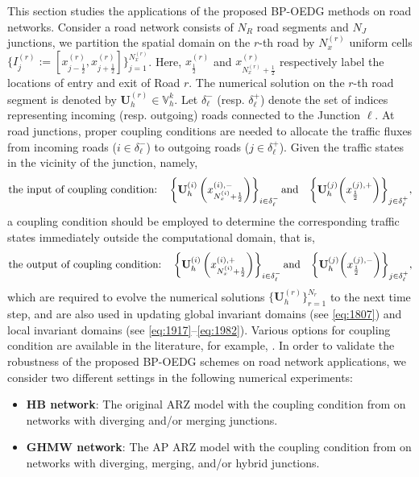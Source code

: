 \documentclass[times,final]{elsarticle}
\numberwithin{equation}{section}
\theoremstyle{definition}
\theoremstyle{remark}
\newcommand{\BU}{\mathbf{U}}
\begin{document}
This section studies the applications of the proposed BP-OEDG methods on road networks. 
Consider a road network consists of $N_R$ road segments and $N_J$ junctions, we partition the spatial domain on the $r$-th road by $N_x^{(r)}$ uniform cells $\big\{I_j^{(r)} := [x^{(r)}_{j - \frac{1}{2}}, x^{(r)}_{j + \frac{1}{2}}] \big \}_{j = 1}^{N_x^{(r)}}$. 
Here, $x^{(r)}_\frac12$ and $x^{(r)}_{N_x^{(r)}+\frac12}$ respectively label the locations of entry and exit of Road $r$.
The numerical solution on the $r$-th road segment is denoted by $\BU^{(r)}_h \in \mathbb{V}^k_h$. Let $\delta_{\ell}^-$ (resp. $\delta_{\ell}^+$) denote the set of indices representing incoming (resp. outgoing) roads connected to the Junction $\ell$. 
At road junctions, proper coupling conditions are needed to allocate the traffic fluxes from incoming roads ($i \in \delta^-_\ell$) to outgoing roads ($j \in \delta^+_\ell$).
Given the traffic states in the vicinity of the junction, namely,
\[
\textrm{the input of coupling condition:}
\quad
\left \{ \BU^{(i)}_h \left(x_{N_x^{(i)} + \frac{1}{2}}^{(i), -} \right) \right \}_{i \in \delta_\ell^-} {\rm and} \quad
\bigg\{ \BU^{(j)}_h \bigg(x_{\frac{1}{2}}^{(j), +} \bigg) \bigg\}_{j \in \delta_\ell^+},
\]
a coupling condition should be employed to determine the corresponding traffic states immediately outside the computational domain, that is,
\[
\textrm{the output of coupling condition:}
\quad
\left \{ \BU^{(i)}_h \left(x_{N_x^{(i)} + \frac{1}{2}}^{(i), +} \right) \right \}_{i \in \delta_\ell^-} {\rm and} \quad
\bigg\{ \BU^{(j)}_h \bigg(x_{\frac{1}{2}}^{(j), -} \bigg) \bigg\}_{j \in \delta_\ell^+},
\]
which are required to evolve the numerical solutions $\{\BU^{(r)}_h\}_{r=1}^{N_r}$ to the next time step, and are also used in updating global invariant domains (see \eqref{eq:1807}) and local invariant domains (see \eqref{eq:1917}--\eqref{eq:1982}). Various options for coupling condition are available in the literature, for example, \cite{garavello2006traffic,herty2006coupling,herty2006optimization,haut2007second,gottlich2021second}. 
In order to validate the robustness of the proposed BP-OEDG schemes on road network applications, we consider two different settings in the following numerical experiments: 
\begin{itemize}[leftmargin=9mm]
	\item{\bf HB network}: The original ARZ model with the coupling condition from \cite{haut2007second} on networks with diverging and/or merging junctions.
	
	\item{\bf GHMW network}: The AP ARZ model with the coupling condition from \cite{gottlich2021second} on networks with diverging, merging, and/or hybrid junctions.
\end{itemize}
\end{document}
